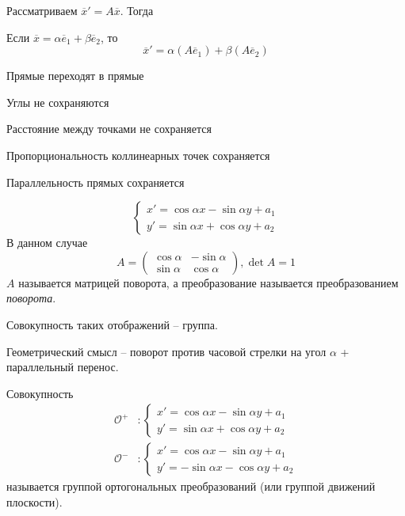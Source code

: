 \begin{Thm}
	Рассматриваем $\overline{x}' = A \overline{x}$. Тогда 
	\begin{MyItemize}
		\item Если $\overline{x} = \alpha \overline{e}_1 + \beta \overline{e}_2$, то
		\[\overline{x}' = \alpha (A \overline{e}_1) + \beta (A \overline{e}_2)\]
		\item Прямые переходят в прямые
		\item Углы не сохраняются
		\item Расстояние между точками не сохраняется
		\item Пропорциональность коллинеарных точек сохраняется
		\item Параллельность прямых сохраняется
	\end{MyItemize}
\end{Thm}


\begin{Def}
	\[\begin{cases}
		x' = \cos \alpha x - \sin \alpha y + a_1 \\
		y' = \sin \alpha x + \cos \alpha y + a_2
	\end{cases}\]
	В данном случае
	\[A = \left(\begin{array}{cc}
	\cos \alpha & -\sin \alpha \\ 
	\sin \alpha & \cos \alpha
	\end{array}\right), \det A = 1\]
	$A$ называется матрицей поворота, а преобразование называется преобразованием \textit{поворота}.  
\end{Def}

\begin{Rem}
	Совокупность таких отображений -- группа.
\end{Rem}

\begin{Rem}
	Геометрический смысл -- поворот против часовой стрелки на угол $\alpha$ + параллельный перенос. 
\end{Rem}

\begin{Def}
	Совокупность
	\begin{align*}
		\mathcal{O^+} &: \begin{cases}
			x' = \cos \alpha x - \sin \alpha y + a_1 \\
			y' = \sin \alpha x + \cos \alpha y + a_2
		\end{cases} \\
		\mathcal{O^-} &: \begin{cases}
			x' = \cos \alpha x - \sin \alpha y + a_1 \\
			y' = -\sin \alpha x - \cos \alpha y + a_2
		\end{cases}
	\end{align*}
	называется группой ортогональных преобразований (или группой движений плоскости).
\end{Def}

